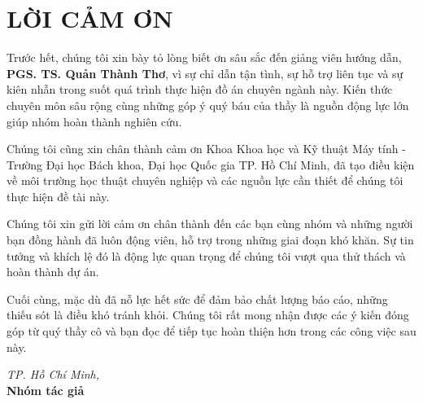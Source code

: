 \chapter*{LỜI CẢM ƠN}

Trước hết, chúng tôi xin bày tỏ lòng biết ơn sâu sắc đến giảng viên hướng dẫn, \textbf{PGS. TS. Quản Thành Thơ}, vì sự chỉ dẫn tận tình, sự hỗ trợ liên tục và sự kiên nhẫn trong suốt quá trình thực hiện đồ án chuyên ngành này. Kiến thức chuyên môn sâu rộng cùng những góp ý quý báu của thầy là nguồn động lực lớn giúp nhóm hoàn thành nghiên cứu.

Chúng tôi cũng xin chân thành cảm ơn Khoa Khoa học và Kỹ thuật Máy tính - Trường Đại học Bách khoa, Đại học Quốc gia TP. Hồ Chí Minh, đã tạo điều kiện về môi trường học thuật chuyên nghiệp và các nguồn lực cần thiết để chúng tôi thực hiện đề tài này.

Chúng tôi xin gửi lời cảm ơn chân thành đến các bạn cùng nhóm và những người bạn đồng hành đã luôn động viên, hỗ trợ trong những giai đoạn khó khăn. Sự tin tưởng và khích lệ đó là động lực quan trọng để chúng tôi vượt qua thử thách và hoàn thành dự án.

Cuối cùng, mặc dù đã nỗ lực hết sức để đảm bảo chất lượng báo cáo, những thiếu sót là điều khó tránh khỏi. Chúng tôi rất mong nhận được các ý kiến đóng góp từ quý thầy cô và bạn đọc để tiếp tục hoàn thiện hơn trong các công việc sau này.

\vspace{1cm}
\begin{flushright}
    \textit{TP. Hồ Chí Minh, \the\year} \\
    \textbf{Nhóm tác giả}
\end{flushright}